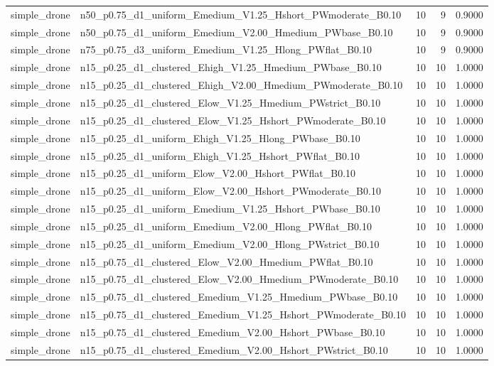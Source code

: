 \begin{tabular}{llrrr}
simple_drone & n50_p0.75_d1_uniform_Emedium_V1.25_Hshort_PWmoderate_B0.10 & 10 & 9 & 0.9000 \\
simple_drone & n50_p0.75_d1_uniform_Emedium_V2.00_Hmedium_PWbase_B0.10 & 10 & 9 & 0.9000 \\
simple_drone & n75_p0.75_d3_uniform_Emedium_V1.25_Hlong_PWflat_B0.10 & 10 & 9 & 0.9000 \\
simple_drone & n15_p0.25_d1_clustered_Ehigh_V1.25_Hmedium_PWbase_B0.10 & 10 & 10 & 1.0000 \\
simple_drone & n15_p0.25_d1_clustered_Ehigh_V2.00_Hmedium_PWmoderate_B0.10 & 10 & 10 & 1.0000 \\
simple_drone & n15_p0.25_d1_clustered_Elow_V1.25_Hmedium_PWstrict_B0.10 & 10 & 10 & 1.0000 \\
simple_drone & n15_p0.25_d1_clustered_Elow_V1.25_Hshort_PWmoderate_B0.10 & 10 & 10 & 1.0000 \\
simple_drone & n15_p0.25_d1_uniform_Ehigh_V1.25_Hlong_PWbase_B0.10 & 10 & 10 & 1.0000 \\
simple_drone & n15_p0.25_d1_uniform_Ehigh_V1.25_Hshort_PWflat_B0.10 & 10 & 10 & 1.0000 \\
simple_drone & n15_p0.25_d1_uniform_Elow_V2.00_Hshort_PWflat_B0.10 & 10 & 10 & 1.0000 \\
simple_drone & n15_p0.25_d1_uniform_Elow_V2.00_Hshort_PWmoderate_B0.10 & 10 & 10 & 1.0000 \\
simple_drone & n15_p0.25_d1_uniform_Emedium_V1.25_Hshort_PWbase_B0.10 & 10 & 10 & 1.0000 \\
simple_drone & n15_p0.25_d1_uniform_Emedium_V2.00_Hlong_PWflat_B0.10 & 10 & 10 & 1.0000 \\
simple_drone & n15_p0.25_d1_uniform_Emedium_V2.00_Hlong_PWstrict_B0.10 & 10 & 10 & 1.0000 \\
simple_drone & n15_p0.75_d1_clustered_Elow_V2.00_Hmedium_PWflat_B0.10 & 10 & 10 & 1.0000 \\
simple_drone & n15_p0.75_d1_clustered_Elow_V2.00_Hmedium_PWmoderate_B0.10 & 10 & 10 & 1.0000 \\
simple_drone & n15_p0.75_d1_clustered_Emedium_V1.25_Hmedium_PWbase_B0.10 & 10 & 10 & 1.0000 \\
simple_drone & n15_p0.75_d1_clustered_Emedium_V1.25_Hshort_PWmoderate_B0.10 & 10 & 10 & 1.0000 \\
simple_drone & n15_p0.75_d1_clustered_Emedium_V2.00_Hshort_PWbase_B0.10 & 10 & 10 & 1.0000 \\
simple_drone & n15_p0.75_d1_clustered_Emedium_V2.00_Hshort_PWstrict_B0.10 & 10 & 10 & 1.0000 \\

\end{tabular}
